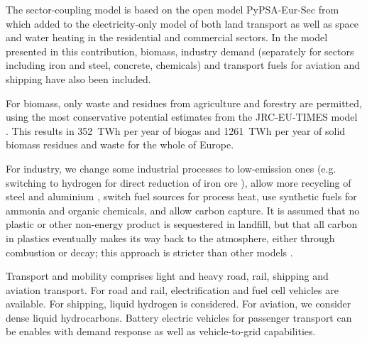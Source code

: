 The sector-coupling model is based on the open model PyPSA-Eur-Sec from
\cite{brownSynergiesSector2018} which added to the electricity-only model of
\cite{schlachtbergerBenefitsCooperation2017} both land transport as well as space and water heating
in the residential and commercial sectors. In the model presented in this
contribution, biomass, industry demand (separately for sectors including iron
and steel, concrete, chemicals) and transport fuels for aviation and shipping
have also been included.

For biomass, only waste and residues from agriculture and forestry are
permitted, using the most conservative potential estimates from the JRC-EU-TIMES
model \cite{jrcbiomass2015}. This results in 352~TWh per year of biogas and
1261~TWh per year of solid biomass residues and waste for the whole of Europe.

For industry, we change some industrial processes to low-emission ones (e.g.
switching to hydrogen for direct reduction of iron ore \cite{voglAssessmentHydrogen2018}), allow
more recycling of steel and aluminium \cite{circular_economy}, switch fuel
sources for process heat, use synthetic fuels for ammonia and organic chemicals,
and allow carbon capture. It is assumed that no plastic or other non-energy
product is sequestered in landfill, but that all carbon in plastics eventually
makes its way back to the atmosphere, either through combustion or decay; this
approach is stricter than other models \cite{in-depth_2018}.

Transport and mobility comprises light and heavy road, rail, shipping and
aviation transport. For road and rail, electrification and fuel cell vehicles are
available. For shipping, liquid hydrogen is considered. For aviation, we
consider dense liquid hydrocarbons. Battery electric vehicles for passenger
transport can be enables with demand response as well as vehicle-to-grid
capabilities.

